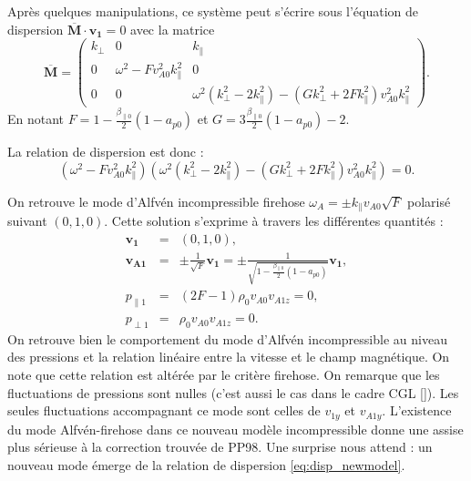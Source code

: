 Après quelques manipulations, ce système peut s'écrire sous l'équation de dispersion $\overline{\boldsymbol{M}} \cdot \boldsymbol{v_1} = 0 $ avec la matrice 
\begin{equation}
 \overline{\boldsymbol{M}} =   \begin{pmatrix}
\label{eq:lin_inccpg_eqdis}  k_{\perp}  & 0 &   k_{\parallel}\\
    0 & \omega^2 - F v^2_{A0}k^2_{\parallel}  & 0 \\
    0 & 0 &  \omega^2( k^2_{\perp}  - 2 k^2_{\parallel}) - (G k^2_{\perp} + 2F k^2_{\parallel}) v^2_{A0} k^2_{\parallel}
    \end{pmatrix} .
\end{equation}
En notant $ F  =  1 - \frac{\beta_{\parallel 0}}{2} (1-a_{p0})$ et $G = 3\frac{\beta_{\parallel 0}}{2} (1-a_{p0}) -2$.

La relation de dispersion est donc : 
\begin{equation}
  \label{eq:disp_newmodel}  (\omega^2 - F v^2_{A0}k^2_{\parallel}) (\omega^2( k^2_{\perp}  - 2 k^2_{\parallel}) - (G k^2_{\perp} + 2F k^2_{\parallel}) v^2_{A0} k^2_{\parallel}) = 0 .
\end{equation}

On retrouve le mode d'Alfvén incompressible firehose $\omega_A = \pm k_{\parallel} v_{A0} \sqrt{F} $ polarisé suivant $(0,1,0)$. Cette solution s'exprime à travers les différentes quantités : 
\begin{eqnarray}
    \boldsymbol{v_{1}} &=& (0,1,0),\\
  \boldsymbol{v_{A1}} &=&  \pm  \frac{1}{\sqrt{F}} \boldsymbol{v_1} = \pm  \frac{1}{\sqrt{1 - \frac{\beta_{\parallel 0}}{2} (1-a_{p0})}} \boldsymbol{v_1} , \\
   p_{\parallel 1} &=&  (2F-1) \rho_0  v_{A0} v_{A1z} = 0,\\
   p_{\perp 1} &=& \rho_0 v_{A0} v_{A1z} = 0 .
\end{eqnarray}
On retrouve bien le comportement du mode d'Alfvén incompressible au niveau des pressions et la relation linéaire entre la vitesse et le champ magnétique. On note que cette relation est altérée par le critère firehose. On remarque que les fluctuations de pressions sont nulles (c'est aussi le cas dans le cadre \ac{CGL} [\cite{hunana_introductory_2019}]). Les seules fluctuations accompagnant ce mode sont celles de $v_{1y}$ et $v_{A1y}$. L'existence du mode Alfvén-firehose dans ce nouveau modèle incompressible donne une assise plus sérieuse à la correction trouvée de \acs{PP98}. Une surprise nous attend : un nouveau mode émerge de la relation de dispersion  \eqref{eq:disp_newmodel}. 

